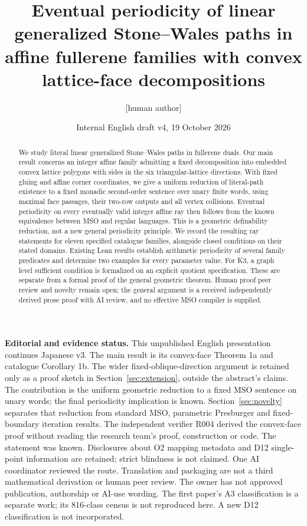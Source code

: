 \documentclass[11pt]{amsart}
\title[Affine fullerene families and eventual periodicity]{Eventual periodicity of linear generalized Stone--Wales paths in affine fullerene families with convex lattice-face decompositions}
\author{[human author]}
\date{Internal English draft v4, 19 October 2026}
\theoremstyle{definition}\newtheorem{definition}{Definition}
\begin{document}
\begin{abstract}
We study literal linear generalized Stone--Wales paths in fullerene
duals. Our main result concerns an integer affine family admitting a
fixed decomposition into embedded convex lattice polygons with sides
in the six triangular-lattice directions. With fixed gluing and affine
corner coordinates, we give a uniform reduction of literal-path
existence to a fixed monadic second-order sentence over unary finite
words, using maximal face passages, their two-row outputs and all
vertex collisions. Eventual periodicity on every eventually valid
integer affine ray then follows from the known equivalence between
MSO and regular languages. This is a geometric definability reduction,
not a new general periodicity principle. We record
the resulting ray statements for eleven specified catalogue families,
alongside closed conditions on their stated domains. Existing Lean
results establish arithmetic periodicity of several family predicates
and determine two examples for every parameter value. For K3, a graph
level sufficient condition is formalized on an explicit quotient
specification. These are separate from a formal proof of the general
geometric theorem. Human proof peer review and novelty remain open;
the general argument is a received independently derived prose proof
with AI review, and no effective MSO compiler is supplied.
\end{abstract}
\maketitle

\noindent\textbf{Editorial and evidence status.}
This unpublished English presentation continues Japanese v3. The
main result is its convex-face Theorem 1a and catalogue Corollary 1b.
The wider fixed-oblique-direction argument is retained only as a proof
sketch in Section~\ref{sec:extension}, outside the abstract's claims.
The contribution is the uniform geometric reduction to a fixed MSO
sentence on unary words; the final periodicity implication is known.
Section~\ref{sec:novelty} separates that reduction from standard
MSO, parametric Presburger and fixed-boundary iteration results.
The independent verifier R004 derived the convex-face proof without
reading the research team's proof, construction or code. The statement
was known. Disclosures about O2 mapping metadata and D12 single-point
information are retained; strict blindness is not claimed. One AI
coordinator reviewed the route. Translation and packaging are not a
third mathematical derivation or human peer review. The owner has not
approved publication, authorship or AI-use wording. The first paper's
A3 classification is a separate work; its 816-class census is not
reproduced here. A new D12 classification is not incorporated.
\end{document}
